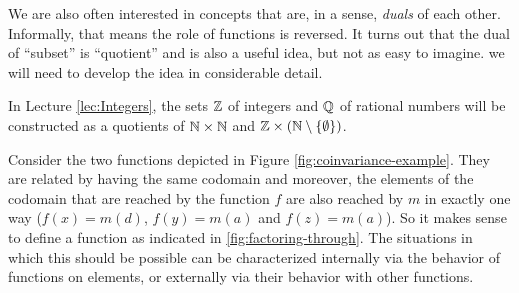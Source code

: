 We are also often interested in concepts that are, in a sense, \emph{duals} of each other. 
Informally, that means the role of functions is reversed.
It turns out that the dual of ``subset'' is ``quotient'' and is also a useful idea, but not as easy to imagine. we will need to develop the idea in considerable detail.

In Lecture \ref{lec:Integers}, the sets $\mathbb Z$ of integers and $\mathbb Q$ of rational numbers will be constructed as a quotients of $\mathbb N\times \mathbb N$ and $\mathbb Z\times (\mathbb N\setminus\{\emptyset\})$.

Consider the two functions depicted in Figure \ref{fig:coinvariance-example}. They are related by having the same codomain and moreover, the elements of the codomain that are reached by the function $f$ are also reached by $m$ in exactly one way ($f(x)=m(d)$, $f(y)=m(a)$ and $f(z)=m(a)$). So it makes sense to define a function as indicated in \ref{fig:factoring-through}. The situations in which this should be possible can be characterized internally via the behavior of functions on elements, or externally via their behavior with other functions. 

